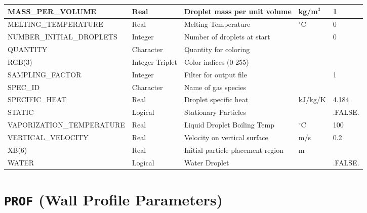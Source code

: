 \documentclass[11pt]{book}
\begin{document}
\begin{table}[H]
\begin{tabular*}{\textwidth}{@{\extracolsep{\fill}}|l|l|l|l|l|}
{\ct MASS\_PER\_VOLUME}         & Real            & Droplet mass per unit volume      & kg/m$^3$  & 1             \\ \hline
{\ct MELTING\_TEMPERATURE}      & Real            & Melting Temperature               & $^\circ$C & 0             \\ \hline
{\ct NUMBER\_INITIAL\_DROPLETS} & Integer         & Number of droplets at start       &           & 0             \\ \hline
{\ct QUANTITY}                  & Character       & Quantity for coloring             &           &               \\ \hline
{\ct RGB(3)}                    & Integer Triplet & Color indices (0-255)             &           &               \\ \hline
{\ct SAMPLING\_FACTOR}          & Integer         & Filter for output file            &           & 1             \\ \hline
{\ct SPEC\_ID}                  & Character       & Name of gas species               &           &               \\ \hline
{\ct SPECIFIC\_HEAT}            & Real            & Droplet specific heat             & kJ/kg/K   & 4.184         \\ \hline
{\ct STATIC}                    & Logical         & Stationary Particles              &           & {\ct .FALSE.} \\ \hline
{\ct VAPORIZATION\_TEMPERATURE} & Real            & Liquid Droplet Boiling Temp       & $^\circ$C & 100           \\ \hline
{\ct VERTICAL\_VELOCITY}        & Real            & Velocity on vertical surface      & m/s       &  0.2          \\ \hline
{\ct XB(6)}                     & Real            & Initial particle placement region & m         &               \\ \hline
{\ct WATER}                     & Logical         & Water Droplet                     &           & {\ct .FALSE.} \\ \hline
\end{tabular*}
\end{table}

\vspace{\baselineskip}

\vfill

\section{\texorpdfstring{{\tt PROF}}{PROF} (Wall Profile Parameters)}
\end{document}
